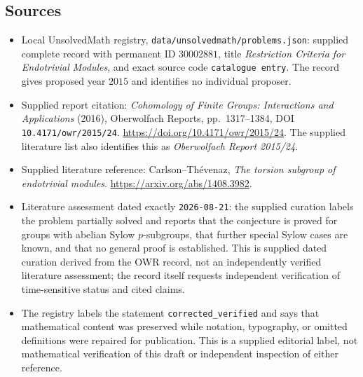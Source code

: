 \documentclass[11pt]{article}
\begin{document}
\subsection{Sources}
\begin{itemize}
\item Local UnsolvedMath registry, \texttt{data/unsolvedmath/problems.json}: supplied complete record with permanent ID \(30002881\), title \emph{Restriction Criteria for Endotrivial Modules}, and exact source code \texttt{catalogue entry}. The record gives proposed year \(2015\) and identifies no individual proposer.
\item Supplied report citation: \emph{Cohomology of Finite Groups: Interactions and Applications} (2016), Oberwolfach Reports, pp.\ 1317--1384, DOI \texttt{10.4171/owr/2015/24}. \url{https://doi.org/10.4171/owr/2015/24}. The supplied literature list also identifies this as \emph{Oberwolfach Report 2015/24}.
\item Supplied literature reference: Carlson--Th\'evenaz, \emph{The torsion subgroup of endotrivial modules}. \url{https://arxiv.org/abs/1408.3982}.
\item Literature assessment dated exactly \texttt{2026-08-21}: the supplied curation labels the problem partially solved and reports that the conjecture is proved for groups with abelian Sylow \(p\)-subgroups, that further special Sylow cases are known, and that no general proof is established. This is supplied dated curation derived from the OWR record, not an independently verified literature assessment; the record itself requests independent verification of time-sensitive status and cited claims.
\item The registry labels the statement \texttt{corrected\_verified} and says that mathematical content was preserved while notation, typography, or omitted definitions were repaired for publication. This is a supplied editorial label, not mathematical verification of this draft or independent inspection of either reference.
\end{itemize}
\end{document}
